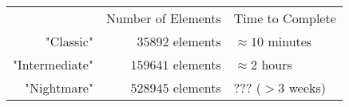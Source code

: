 \begin{tabular}{r | r | l}
 & Number of Elements & Time to Complete\\
"Classic" & \(35892\) elements & \(\approx 10\) minutes\\
"Intermediate" & \(159641\) elements & \(\approx 2\) hours\\
"Nightmare" & \(528945\) elements & ??? (\(>3\) weeks)\\
\end{tabular}
